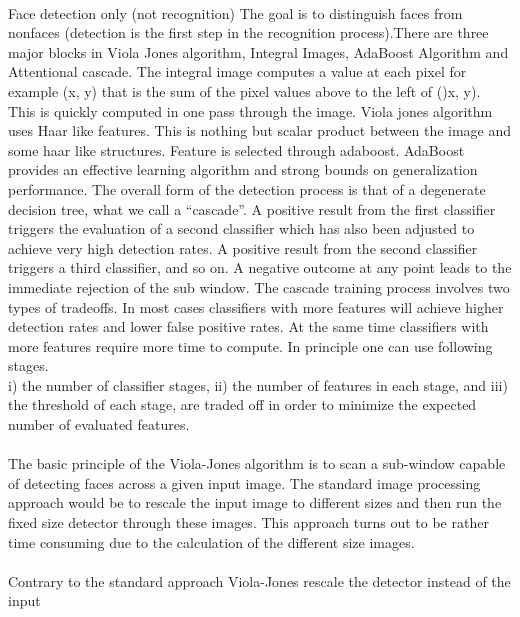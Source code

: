 \documentclass[a4paper, 12pt]{report}
\begin{document}
\paragraph{}
Face detection only (not recognition) The goal is to distinguish faces from nonfaces (detection is the first step in the recognition process).There are three major blocks in Viola Jones
algorithm, Integral Images, AdaBoost Algorithm and Attentional cascade. The integral image
computes a value at each pixel for example (x, y) that is the sum of the pixel values above to the
left of ()x, y). This is quickly computed in one pass through the image. Viola jones algorithm
uses Haar like features. This is nothing but scalar product between the image and some haar
like structures. Feature is selected through adaboost. AdaBoost provides an effective learning
algorithm and strong bounds on generalization performance. The overall form of the detection
process is that of a degenerate decision tree, what we call a “cascade”. A positive result from
the first classifier triggers the evaluation of a second classifier which has also been adjusted to
achieve very high detection rates. A positive result from the second classifier triggers a third
classifier, and so on. A negative outcome at any point leads to the immediate rejection of the sub
window. The cascade training process involves two types of tradeoffs. In most cases classifiers
with more features will achieve higher detection rates and lower false positive rates. At the
same time classifiers with more features require more time to compute. In principle one can use
following stages.
\\i) the number of classifier stages, ii) the number of features in each stage, and iii) the
threshold of each stage, are traded off in order to minimize the expected number of evaluated
features.\paragraph{}
The basic principle of the Viola-Jones algorithm is to scan a sub-window capable of detecting faces across a given input image. The standard image processing approach would be
to rescale the input image to different sizes and then run the fixed size detector through these
images. This approach turns out to be rather time consuming due to the calculation of the
different size images.\paragraph{}
Contrary to the standard approach Viola-Jones rescale the detector instead of the input
\end{document}
